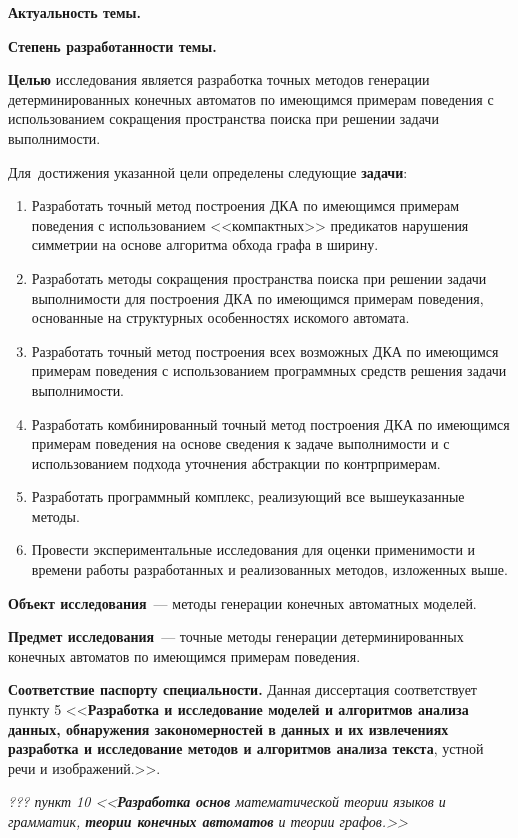 \textbf{Актуальность темы.} 

\textbf{Степень разработанности темы.}

\textbf{Целью} исследования является разработка точных методов генерации детерминированных конечных автоматов по имеющимся примерам поведения с использованием сокращения пространства поиска при решении задачи выполнимости.

Для~достижения указанной цели определены следующие \textbf{задачи}:
\begin{enumerate}
  \item Разработать точный метод построения ДКА по имеющимся примерам поведения с использованием <<компактных>> предикатов нарушения симметрии на основе алгоритма обхода графа в ширину.
  \item Разработать методы сокращения пространства поиска при решении задачи выполнимости для 
  построения ДКА по имеющимся примерам поведения, основанные на структурных особенностях искомого автомата.
  \item Разработать точный метод построения всех возможных ДКА по имеющимся примерам поведения с использованием программных средств решения задачи выполнимости.
  \item Разработать комбинированный точный метод построения ДКА по имеющимся примерам поведения на основе сведения к задаче выполнимости и с использованием подхода уточнения абстракции по контрпримерам.
  \item Разработать программный комплекс, реализующий все вышеуказанные методы.
  \item Провести экспериментальные исследования для оценки применимости и времени работы разработанных и реализованных методов, изложенных выше. 
\end{enumerate}

\textbf{Объект исследования}~{---} методы генерации конечных автоматных моделей.

\textbf{Предмет исследования}~{---} точные методы генерации детерминированных конечных автоматов по имеющимся примерам поведения.

\textbf{Соответствие паспорту специальности.} Данная диссертация соответствует пункту 5 <<\textbf{Разработка и исследование моделей и алгоритмов анализа данных, обнаружения закономерностей в данных и их извлечениях разработка и исследование методов и алгоритмов анализа текста}, устной речи и изображений.>>.

\emph{??? пункт 10 <<\textbf{Разработка основ} математической теории языков и грамматик, \textbf{теории конечных автоматов} и теории графов.>>}

